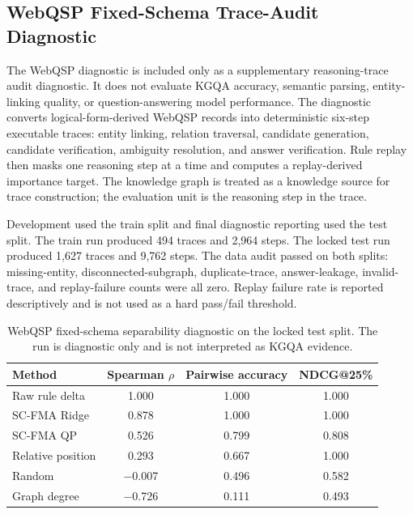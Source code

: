 \documentclass[a4paper,fleqn]{cas-sc}
\begin{document}
\subsection{WebQSP Fixed-Schema Trace-Audit Diagnostic}
\label{app:webqsp-trace-audit}

The WebQSP diagnostic is included only as a supplementary reasoning-trace audit diagnostic. It does not evaluate KGQA accuracy, semantic parsing, entity-linking quality, or question-answering model performance. The diagnostic converts logical-form-derived WebQSP records into deterministic six-step executable traces: entity linking, relation traversal, candidate generation, candidate verification, ambiguity resolution, and answer verification. Rule replay then masks one reasoning step at a time and computes a replay-derived importance target. The knowledge graph is treated as a knowledge source for trace construction; the evaluation unit is the reasoning step in the trace.

Development used the train split and final diagnostic reporting used the test split. The train run produced 494 traces and 2,964 steps. The locked test run produced 1,627 traces and 9,762 steps. The data audit passed on both splits: missing-entity, disconnected-subgraph, duplicate-trace, answer-leakage, invalid-trace, and replay-failure counts were all zero. Replay failure rate is reported descriptively and is not used as a hard pass/fail threshold.

\begin{table}[ht]
\caption{WebQSP fixed-schema separability diagnostic on the locked test split. The run is diagnostic only and is not interpreted as KGQA evidence.}
\label{tab:supp-webqsp-diagnostic}
\centering
\small
\begin{tabular}{lccc}
\toprule
\textbf{Method} & \textbf{Spearman $\rho$} & \textbf{Pairwise accuracy} & \textbf{NDCG@25\%} \\
\midrule
Raw rule delta & 1.000 & 1.000 & 1.000 \\
SC-FMA Ridge & 0.878 & 1.000 & 1.000 \\
SC-FMA QP & 0.526 & 0.799 & 0.808 \\
Relative position & 0.293 & 0.667 & 1.000 \\
Random & $-$0.007 & 0.496 & 0.582 \\
Graph degree & $-$0.726 & 0.111 & 0.493 \\
\bottomrule
\end{tabular}
\end{table}
\end{document}
